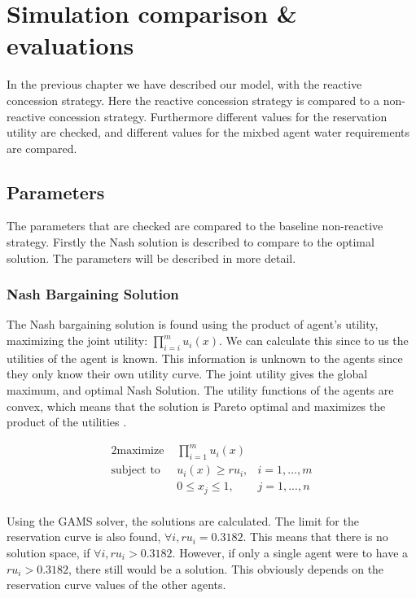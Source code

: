 \chapter{Simulation comparison \& evaluations}
In the previous chapter we have described our model, with the reactive concession strategy. Here the reactive concession strategy is compared to a non-reactive concession strategy. Furthermore different values for the reservation utility are checked, and different values for the mixbed agent water requirements are compared. 

\section{Parameters}
The parameters that are checked are compared to the baseline non-reactive strategy. Firstly the Nash solution is described to compare to the optimal solution. The parameters will be described in more detail.

\subsection{Nash Bargaining Solution}
The Nash bargaining solution is found using the product of agent's utility, maximizing the joint utility: $\prod_{i=i}^{m}u_i(x).$ We can calculate this since to us the utilities of the agent is known. This information is unknown to the agents since they only know their own utility curve. The joint utility gives the global maximum, and optimal Nash Solution. The utility functions of the agents are convex, which means that the solution is Pareto optimal and maximizes the product of the utilities \citep{nash1950bargaining, roth1977individual, lensberg1988stability}. 

\begin{alignat*}{2}
\text{maximize }   	& \prod_{i=1}^m u_i(x)  \\
\text{subject to \ } 	& u_i(x) \geq ru_i, & i = 1,...,m\\
& 0\leq x_j\leq 1, & j = 1,...,n\\
\end{alignat*}

Using the GAMS solver, the solutions are calculated. The limit for the reservation curve is also found, $\forall i,  ru_i = 0.3182$. This means that there is no solution space, if $\forall i, ru_i > 0.3182$. However, if only a single agent were to have a $ru_i > 0.3182$, there still would be a solution. This obviously depends on the reservation curve values of the other agents. 


